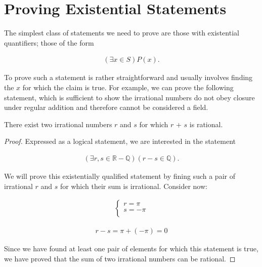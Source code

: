 \documentclass[twoside]{report}
\begin{document}
\section{Proving Existential Statements}

The simplest class of statements we need to prove are those with existential quantifiers; those of the form

\begin{align*}
	(\exists x \in S)P(x).
\end{align*}

To prove such a statement is rather straightforward and usually involves finding the $x$ for which the claim is true. For example, we can prove the following statement, which is sufficient to show the irrational numbers do not obey closure under regular addition and therefore cannot be considered a field.

\vspace{\baselineskip}
\begin{theorem}
	There exist two irrational numbers $r$ and $s$ for which $r$ + $s$ is rational.
\end{theorem}
\begin{proof}
	Expressed as a logical statement, we are interested in the statement
	
	\begin{align*}
		(\exists r, s \in \mathbb{R} - \mathbb{Q})(r - s \in \mathbb{Q}).
	\end{align*}
	
	We will prove this existentially qualified statement by fining such a pair of irrational $r$ and $s$ for which their sum is irrational. Consider now:
	
	\begin{align*}
		\begin{cases}
			r = \pi \\
			s = -\pi \\
		\end{cases}
	\end{align*}
	
	\begin{align*}
		r - s = \pi + (-\pi) = 0
	\end{align*}
	
	Since we have found at least one pair of elements for which this statement is true, we have proved that the sum of two irrational numbers can be rational.
\end{proof}
\vspace{\baselineskip}
\end{document}
